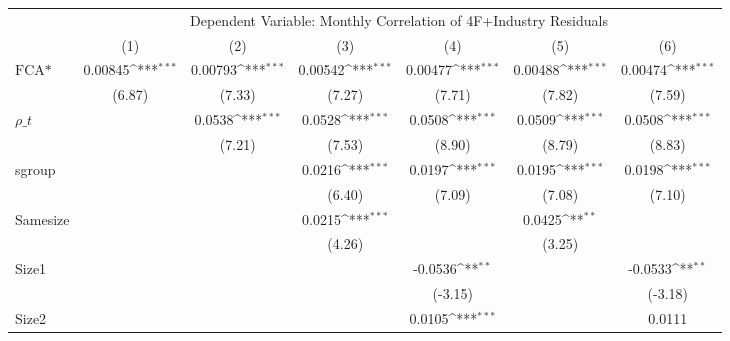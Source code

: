 {
\def\sym#1{\ifmmode^{#1}\else\(^{#1}\)\fi}
\begin{tabular}{l*{6}{c}}
\hline\hline
 & \multicolumn{6}{c}{Dependent Variable: Monthly Correlation of 4F+Industry Residuals}                 \\
 \cline{2-6}
                    &\multicolumn{1}{c}{(1)}         &\multicolumn{1}{c}{(2)}         &\multicolumn{1}{c}{(3)}         &\multicolumn{1}{c}{(4)}         &\multicolumn{1}{c}{(5)}         &\multicolumn{1}{c}{(6)}         \\
\hline
$ \text{FCA*} $     &     0.00845\sym{***}&     0.00793\sym{***}&     0.00542\sym{***}&     0.00477\sym{***}&     0.00488\sym{***}&     0.00474\sym{***}\\
                    &      (6.87)         &      (7.33)         &      (7.27)         &      (7.71)         &      (7.82)         &      (7.59)         \\
[1em]
 $ \rho\_t $         &                     &      0.0538\sym{***}&      0.0528\sym{***}&      0.0508\sym{***}&      0.0509\sym{***}&      0.0508\sym{***}\\
                    &                     &      (7.21)         &      (7.53)         &      (8.90)         &      (8.79)         &      (8.83)         \\
[1em]
sgroup              &                     &                     &      0.0216\sym{***}&      0.0197\sym{***}&      0.0195\sym{***}&      0.0198\sym{***}\\
                    &                     &                     &      (6.40)         &      (7.09)         &      (7.08)         &      (7.10)         \\
[1em]
Samesize            &                     &                     &      0.0215\sym{***}&                     &      0.0425\sym{**} &                     \\
                    &                     &                     &      (4.26)         &                     &      (3.25)         &                     \\
[1em]
Size1               &                     &                     &                     &     -0.0536\sym{**} &                     &     -0.0533\sym{**} \\
                    &                     &                     &                     &     (-3.15)         &                     &     (-3.18)         \\
[1em]
Size2               &                     &                     &                     &      0.0105\sym{***}&                     &      0.0111         \\

\end{tabular}}
